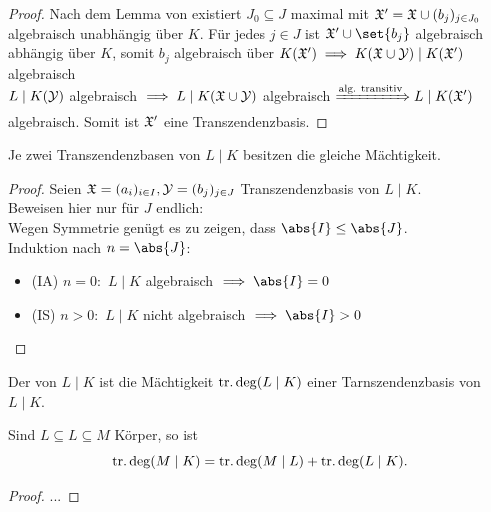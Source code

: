 \begin{proof}
	Nach dem Lemma von  existiert $J_0 \subseteq J$ maximal mit $\mathfrak{X}' = \mathfrak{X} \cup (b_j)_{j \in J_0}$ algebraisch unabhängig über $K$. Für jedes $j \in J$ ist $\Halb' \cup \set{b_j}$ algebraisch abhängig über $K$, somit $b_j$ algebraisch über $K(\mathfrak{X}') \implies K(\mathfrak{X} \cup \mathcal{Y}) \mid K(\mathfrak{X}')$ algebraisch\\
	$L \mid K(\mathcal{Y})$ algebraisch $\implies L\mid K(\mathfrak{X} \cup \mathcal{Y})$ algebraisch $\xRightarrow{\text{alg. transitiv}} L \mid K(\mathfrak{X}')$ algebraisch. Somit ist $\mathfrak{X}'$ eine Transzendenzbasis.
\end{proof}
\begin{theorem}[Steinitz, 1910]
	Je zwei Transzendenzbasen von $L \mid K$ besitzen die gleiche Mächtigkeit.
\end{theorem}
\begin{proof}
	Seien $\mathfrak{X} = (a_i)_{i\in I}, \mathcal{Y} = (b_j)_{j \in J}$ Transzendenzbasis von $L \mid K$.\\ 
	Beweisen hier nur für $J$ endlich:\\
	Wegen Symmetrie genügt es zu zeigen, dass $\abs{I} \le \abs{J}$.\\
	Induktion nach $n = \abs{J}$:
	\begin{itemize}
		\item (IA) $n =0:$ $L \mid K$ algebraisch $\implies \abs{I} = 0$
		\item (IS) $n > 0:$ $L \mid K$ nicht algebraisch $\implies \abs{I} > 0$ %
	\end{itemize}
\end{proof}
\begin{definition}[Transzendenzgrad]
	Der  von $L \mid K$ ist die Mächtigkeit $\operatorname{tr.deg}(L\mid K)$ einer Tarnszendenzbasis von $L \mid K$.
\end{definition}
\begin{conclusion}
	Sind $L \subseteq L \subseteq M$ Körper, so ist
	\[
		\operatorname{tr.deg}(M\mid K) = \operatorname{tr.deg}(M \mid L) + \operatorname{tr.deg}(L \mid K).
	\]
\end{conclusion}
\begin{proof}
	... %
\end{proof}